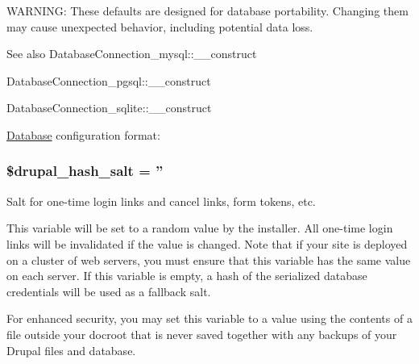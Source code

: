 WARNING: These defaults are designed for database portability. Changing them may cause unexpected behavior, including potential data loss.

\begin{DoxySeeAlso}{See also}
DatabaseConnection\_\-mysql::\_\-\_\-construct 

DatabaseConnection\_\-pgsql::\_\-\_\-construct 

DatabaseConnection\_\-sqlite::\_\-\_\-construct
\end{DoxySeeAlso}
\hyperlink{classDatabase}{Database} configuration format: 
 \hypertarget{default_8settings_8php_a75c981b07486dd3b07d5f122702dd87e}{
\subsubsection[{\$drupal\_\-hash\_\-salt}]{\setlength{\rightskip}{0pt plus 5cm}\$drupal\_\-hash\_\-salt = ''}}
\label{default_8settings_8php_a75c981b07486dd3b07d5f122702dd87e}
Salt for one-\/time login links and cancel links, form tokens, etc.

This variable will be set to a random value by the installer. All one-\/time login links will be invalidated if the value is changed. Note that if your site is deployed on a cluster of web servers, you must ensure that this variable has the same value on each server. If this variable is empty, a hash of the serialized database credentials will be used as a fallback salt.

For enhanced security, you may set this variable to a value using the contents of a file outside your docroot that is never saved together with any backups of your Drupal files and database.

